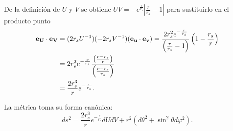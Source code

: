 De la definición de \( U \) y \( V \) se obtiene $UV = -e^{\frac{r}{r_s}}\left|\frac{r}{r_s} - 1\right|$ para sustituirlo en el producto punto
\begin{equation}
    \begin{aligned}
        \mathbf{e_U} \cdot \mathbf{e_V} &= (2r_s U^{-1})(-2r_s V^{-1})(\mathbf{e_u} \cdot \mathbf{e_v}) = \frac{2r_s^2 e^{-\frac{r}{r_s}}}{\left(\frac{r}{r_s} - 1\right)}\left(1-\frac{r_s}{r}\right)\\
        & =2r_s^2 e^{-\frac{r}{r_s}} \frac{\left(\frac{r - r_s}{r}\right)}{\left(\frac{r -r_s}{r_s}\right)}\\
        & = \frac{2r_s^3}{r} e^{-\frac{r}{r_s}}.
    \end{aligned}
\end{equation}

La métrica toma su forma canónica:
\begin{equation}
    ds^2 = \frac{2 r_s^3}{r}e^{-\frac{r}{r_s}} dUdV + r^2(d\theta^2 + \sin^2\theta d\varphi^2).
\end{equation}

